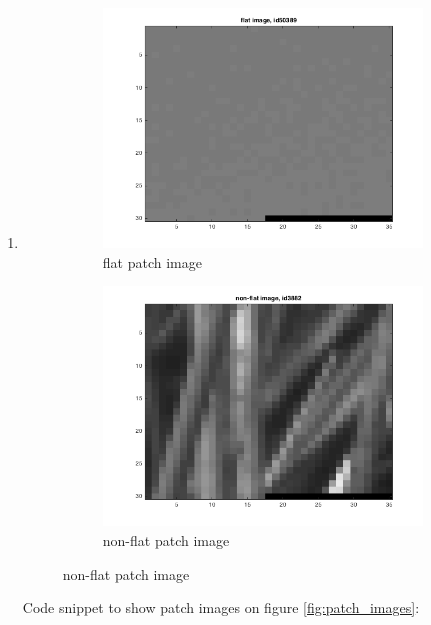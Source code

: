 \documentclass{article}
\begin{document}
\begin{enumerate}[label=(\alph*)]
				\newpage
				\item
				 	\begin{figure}[t]
				 		\centering
				 		\caption{patch images}
				 		\label{fig:patch_images}
						\begin{subfigure}{0.5\textwidth}
											      	\includegraphics[width=\linewidth]{images/p1-1-c_flat}
											      	\caption{flat patch image}
											      	\label{fig:flat_patch_image}
						\end{subfigure}%
						\begin{subfigure}{0.5\textwidth}
											      	\includegraphics[width=\linewidth]{images/p1-1-c_non_flat}
											      	\caption{non-flat patch image}
											      	\label{fig:non-flat_patch_image}
						\end{subfigure}%
				 	\end{figure}
					 Code snippet to show patch images on figure \ref{fig:patch_images}:
				 	  
			\end{enumerate}		
\end{document}
